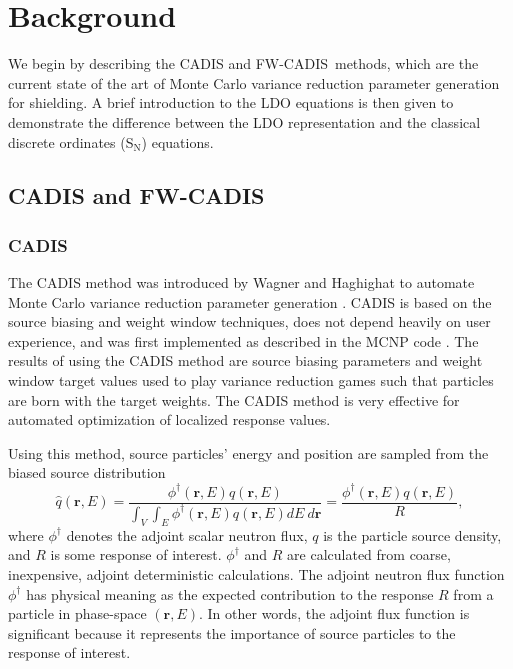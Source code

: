 \documentclass{article} %
\newcommand{\vecr}{\textbf{r}}
\newcommand{\sn}{S$_\mathrm{N}$}
\newcommand{\qhat}{\ensuremath{\hat{q}}}
\newcommand{\fwc}{\mbox{FW-CADIS}}
\begin{document}
\section{Background}
\label{sec:background}

We begin by describing the CADIS and \fwc\ methods, which are the current
state of the art of Monte Carlo variance reduction parameter generation for
shielding. A brief introduction to the LDO equations is then given to
demonstrate the difference between the LDO representation and the classical
discrete ordinates (\sn) equations.

\subsection{CADIS and \fwc}

\subsubsection{CADIS}

The CADIS method was introduced by Wagner and Haghighat to automate Monte
Carlo variance reduction parameter generation \cite{cadis}. CADIS is based on
the source biasing and weight window techniques, does not depend heavily on
user experience, and was first implemented as described 
in the MCNP code \cite{cadis}. The results of using the CADIS method are
source biasing parameters and weight window target values used to play
variance reduction games such that particles are born with the target weights.
The CADIS method is very effective for automated optimization of localized
response values.

Using this method, source particles' energy and position are sampled from the
biased source distribution
%
\begin{equation}
\qhat(\vecr,E) = 
\frac{\phi^{\dagger}(\vecr,E)q(\vecr,E)}
{\int_V\int_E\phi^{\dagger}(\vecr,E)q(\vecr,E) dE\ d\vecr} 
= \frac{\phi^{\dagger}(\vecr,E)q(\vecr,E)}{R},
\label{eq:cadis_sb}
\end{equation}
%
where $\phi^{\dagger}$ denotes the adjoint scalar neutron flux, $q$ is the
particle source density, and $R$ is some response of interest.
$\phi^{\dagger}$ and $R$ are calculated from coarse, inexpensive, adjoint
deterministic calculations. The adjoint neutron flux function $\phi^{\dagger}$
has physical meaning as the expected contribution to the response $R$ from a
particle in phase-space $(\vecr,E)$. In other words, the adjoint flux
function is significant because it represents the importance of source
particles to the response of interest.
\end{document}
